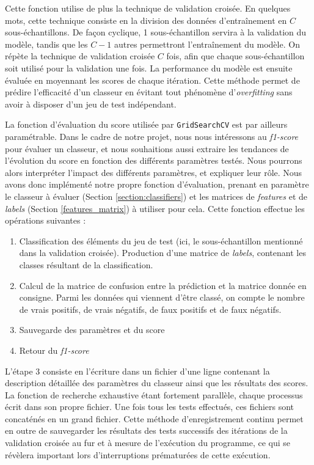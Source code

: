 \documentclass[a4paper]{report}
\begin{document}
Cette fonction utilise de plus la technique de validation croisée. En quelques mots, cette technique consiste en la division des données d'entraînement en $C$ sous-échantillons. De façon cyclique, 1 sous-échantillon servira à la validation du modèle, tandis que les $C-1$ autres permettront l'entraînement du modèle. On répète la technique de validation croisée $C$ fois, afin que chaque sous-échantillon soit utilisé pour la validation une fois. La performance du modèle est ensuite évaluée en moyennant les scores de chaque itération. Cette méthode permet de prédire l'efficacité d'un classeur en évitant tout phénomène d'\emph{overfitting} sans avoir à disposer d'un jeu de test indépendant.

La fonction d'évaluation du score utilisée par \texttt{GridSearchCV} est par ailleurs paramétrable. Dans le cadre de notre projet, nous nous intéressons au \emph{f1-score} pour évaluer un classeur, et nous souhaitions aussi extraire les tendances de l'évolution du score en fonction des différents paramètres testés. Nous pourrons alors interpréter l'impact des différents paramètres, et expliquer leur rôle. Nous avons donc implémenté notre propre fonction d'évaluation, prenant en paramètre le classeur à évaluer (Section \ref{section:classifiers}) et les matrices de \emph{features} et de \emph{labels} (Section \ref{features_matrix}) à utiliser pour cela. Cette fonction effectue les opérations suivantes :

\begin{enumerate}
\item Classification des éléments du jeu de test (ici, le sous-échantillon mentionné dans la validation croisée). Production d'une matrice de \emph{labels}, contenant les classes résultant de la classification.
\item Calcul de la matrice de confusion entre la prédiction et la matrice donnée en consigne. Parmi les données qui viennent d'être classé, on compte le nombre de vrais positifs, de vrais négatifs, de faux positifs et de faux négatifs.
\item Sauvegarde des paramètres et du score
\item Retour du \emph{f1-score}
\end{enumerate}

L'étape 3 consiste en l'écriture dans un fichier d'une ligne contenant la description détaillée des paramètres du classeur ainsi que les résultats des scores. La fonction de recherche exhaustive étant fortement parallèle, chaque processus écrit dans son propre fichier. Une fois tous les tests effectués, ces fichiers sont concaténés en un grand fichier. Cette méthode d'enregistrement continu permet en outre de sauvegarder les résultats des tests successifs des itérations de la validation croisée au fur et à mesure de l'exécution du programme, ce qui se révèlera important lors d'interruptions prématurées de cette exécution.
\end{document}
